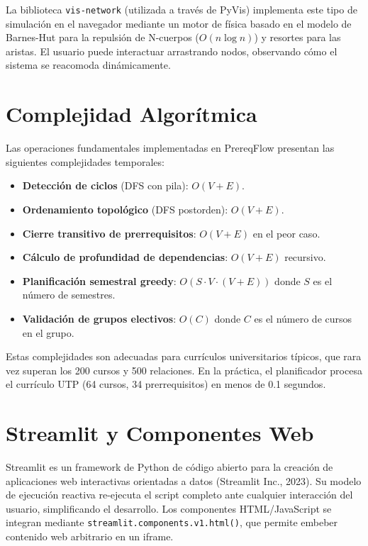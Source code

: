 \documentclass[12pt]{report}
\begin{document}
La biblioteca \texttt{vis-network} (utilizada a través de PyVis) implementa este tipo de simulación en el navegador mediante un motor de física basado en el modelo de Barnes-Hut para la repulsión de N-cuerpos ($O(n \log n)$) y resortes para las aristas. El usuario puede interactuar arrastrando nodos, observando cómo el sistema se reacomoda dinámicamente.

\section{Complejidad Algorítmica}

Las operaciones fundamentales implementadas en PrereqFlow presentan las siguientes complejidades temporales:

\begin{itemize}
    \item \textbf{Detección de ciclos} (DFS con pila): $O(V + E)$.
    \item \textbf{Ordenamiento topológico} (DFS postorden): $O(V + E)$.
    \item \textbf{Cierre transitivo de prerrequisitos}: $O(V + E)$ en el peor caso.
    \item \textbf{Cálculo de profundidad de dependencias}: $O(V + E)$ recursivo.
    \item \textbf{Planificación semestral greedy}: $O(S \cdot V \cdot (V + E))$ donde $S$ es el número de semestres.
    \item \textbf{Validación de grupos electivos}: $O(C)$ donde $C$ es el número de cursos en el grupo.
\end{itemize}

Estas complejidades son adecuadas para currículos universitarios típicos, que rara vez superan los 200 cursos y 500 relaciones. En la práctica, el planificador procesa el currículo UTP (64 cursos, 34 prerrequisitos) en menos de 0.1 segundos.

\section{Streamlit y Componentes Web}

Streamlit es un framework de Python de código abierto para la creación de aplicaciones web interactivas orientadas a datos (Streamlit Inc., 2023). Su modelo de ejecución reactiva re-ejecuta el script completo ante cualquier interacción del usuario, simplificando el desarrollo. Los componentes HTML/JavaScript se integran mediante \texttt{streamlit.components.v1.html()}, que permite embeber contenido web arbitrario en un iframe.
\end{document}
